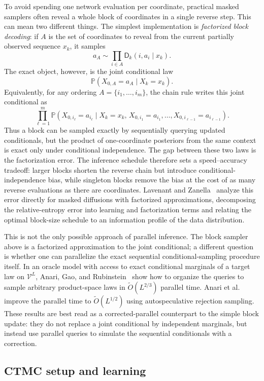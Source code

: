 \documentclass{amsart}
\numberwithin{equation}{section}
\theoremstyle{plain}
\theoremstyle{definition}
\theoremstyle{remark}
\newcommand{\Pp}{\mathbb{P}}
\newcommand{\mc}[1]{\mathcal{#1}}
\newcommand{\denoiser}{\mathsf{D}}
\newcommand{\tO}{\widetilde O}
\begin{document}
To avoid spending one network evaluation per coordinate, practical masked
samplers often reveal a whole block of coordinates in a single reverse step.
This can mean two different things.  The simplest implementation is
\emph{factorized block decoding}: if $A$ is the set of coordinates to reveal from
the current partially observed sequence $x_k$, it samples
\[
    a_A\sim \prod_{i\in A}\denoiser_k(i,a_i\mid x_k).
\]
The exact object, however, is the joint conditional law
\[
    \Pp(X_{0,A}=a_A\mid X_k=x_k).
\]
Equivalently, for any ordering $A=\{i_1,\ldots,i_m\}$, the chain rule writes this
joint conditional as
\[
    \prod_{\ell=1}^{m}
    \Pp\!\left(
    X_{0,i_\ell}=a_{i_\ell}
    \mid
    X_k=x_k,\,
    X_{0,i_1}=a_{i_1},\ldots,X_{0,i_{\ell-1}}=a_{i_{\ell-1}}
    \right).
\]
Thus a block can be sampled exactly by sequentially querying updated
conditionals, but the product of one-coordinate posteriors from the same context
is exact only under conditional independence.  The gap between these two laws is
the factorization error.  The inference schedule therefore sets a
speed--accuracy tradeoff: larger blocks shorten the reverse chain but introduce
conditional-independence bias, while singleton blocks remove the bias at the cost
of as many reverse evaluations as there are coordinates.  Lavenant and
Zanella~\cite{lavenant2025masked} analyze this error directly for masked
diffusions with factorized approximations, decomposing the relative-entropy error
into learning and factorization terms and relating the optimal block-size
schedule to an information profile of the data distribution.

This is not the only possible approach of parallel inference.  The block
sampler above is a factorized approximation to the joint conditional; a
different question is whether one can parallelize the exact sequential
conditional-sampling procedure itself.  In an oracle model with access to exact
conditional marginals of a target law on $\mc{V}^L$, Anari, Gao, and
Rubinstein~\cite{anari2024parallelcounting} show how to organize the queries to
sample arbitrary product-space laws in $\tO(L^{2/3})$ parallel time.
Anari et al.~\cite{anari2025autospeculation} improve the parallel time to
$\tO(L^{1/2})$ using autospeculative rejection sampling.  These results are best
read as a corrected-parallel counterpart to the simple block update: they do not
replace a joint conditional by independent marginals, but instead use parallel
queries to simulate the sequential conditionals with a correction.

\subsection{CTMC setup and learning}
\label{subsec:ctmc-setup-learning}
\end{document}
